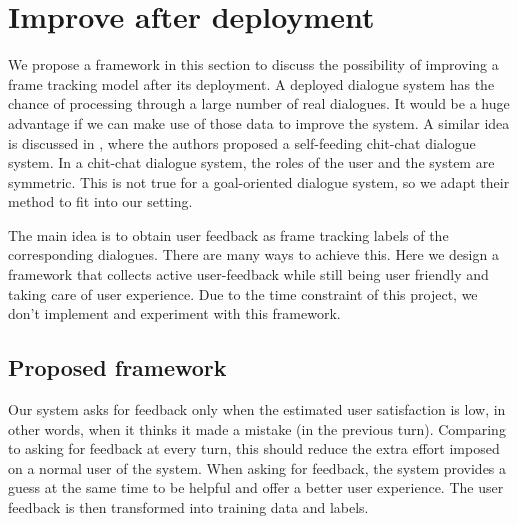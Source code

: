 \section{Improve after deployment}



We propose a framework in this section to discuss the possibility of improving a frame tracking model after its deployment. A deployed dialogue system has the chance of processing through a large number of real dialogues. It would be a huge advantage if we can make use of those data to improve the system. A similar idea is discussed in \cite{hancock2019learning}, where the authors proposed a self-feeding chit-chat dialogue system.
In a chit-chat dialogue system, the roles of the user and the system are symmetric. This is not true for a goal-oriented dialogue system, so we adapt their method to fit into our setting.

The main idea is to obtain user feedback as frame tracking labels of the corresponding dialogues.
There are many ways to achieve this. Here we design a framework that collects active user-feedback while still being user friendly and taking care of user experience.
Due to the time constraint of this project, we don't implement and experiment with this framework.

\subsection{Proposed framework}
Our system asks for feedback only when the estimated user satisfaction is low, in other words, when it thinks it made a mistake (in the previous turn). Comparing to asking for feedback at every turn, this should reduce the extra effort imposed on a normal user of the system.
When asking for feedback, the system provides a guess at the same time to be helpful and offer a better user experience. The user feedback is then transformed into training data and labels.

